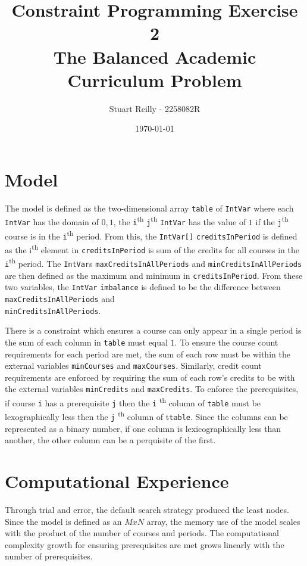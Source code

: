\documentclass[11pt]{article}
\title{Constraint Programming Exercise 2\\The Balanced Academic Curriculum Problem}
\date{\today}
\author{Stuart Reilly - 2258082R}
\begin{document}
    \maketitle

    \section{Model}\label{sec:model}
    The model is defined as the two-dimensional array \texttt{table} of \texttt{IntVar} where each \texttt{IntVar} has
    the domain of \({0,1}\), the \texttt{i}\textsuperscript{th} \texttt{j}\textsuperscript{th} \texttt{IntVar} has the
    value of \(1\) if the \texttt{j}\textsuperscript{th} course is in the \texttt{i}\textsuperscript{th} period.
    From this, the \texttt{IntVar[]} \texttt{creditsInPeriod} is defined as the i\textsuperscript{th} element in
    \texttt{creditsInPeriod} is sum of the credits for all courses in the \texttt{i}\textsuperscript{th} period.
    The \texttt{IntVar}s \texttt{maxCreditsInAllPeriods} and \texttt{minCreditsInAllPeriods} are then defined as the
    maximum and minimum in \texttt{creditsInPeriod}.
    From these two variables, the \texttt{IntVar} \texttt{imbalance} is defined to be the difference between
    \texttt{maxCreditsInAllPeriods} and\\\texttt{minCreditsInAllPeriods}.

    There is a constraint which ensures a course can only appear in a single period is the sum of each column in
    \texttt{table} must equal \(1\).
    To ensure the course count requirements for each period are met, the sum of each row must be within the external
    variables \texttt{minCourses} and \texttt{maxCourses}.
    Similarly, credit count requirements are enforced by requiring the sum of each row's credits to be with the external
    variables \texttt{minCredits} and \texttt{maxCredits}.
    To enforce the prerequisites, if course \texttt{i} has a prerequisite \texttt{j} then the \texttt{i}
    \textsuperscript{th} column of \texttt{table} must be lexographically less then the \texttt{j}
    \textsuperscript{th} column of t\texttt{table}.
    Since the columns can be represented as a binary number, if one column is lexicographically less than another, the
    other column can be a perquisite of the first.

    \section{Computational Experience}\label{sec:computational-experience}
    Through trial and error, the default search strategy produced the least nodes.
    Since the model is defined as an \(MxN\) array, the memory use of the model scales with the product of the number of
    courses and periods.
    The computational complexity growth for ensuring prerequisites are met grows linearly with the number of
    prerequisites.
\end{document}
